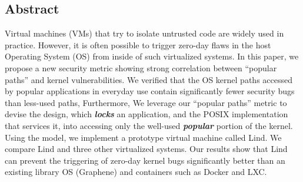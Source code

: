 \subsection*{Abstract}

%
%

%
%

Virtual machines (VMs) that try to isolate untrusted code are widely used in practice. 
However, it is often possible to trigger zero-day flaws
in the host Operating System (OS) from inside of such virtualized systems.
%
In this paper, we propose a new security metric showing strong correlation between ``popular paths'' 
and kernel vulnerabilities. We verified that the OS kernel paths accessed 
by popular applications in everyday use contain significantly fewer security bugs than less-used paths, 
Furthermore, We leverage our ``popular paths'' metric to devise the \lip design, which
\textbf{\textit{locks}} an application, and the POSIX implementation that services it, into
accessing only the well-used \textbf{\textit{popular}} portion of the kernel.  Using the \lip model, we
implement a prototype virtual machine called Lind.
%
We compare Lind and three other virtualized systems. 
Our results show that Lind can prevent the triggering of zero-day kernel bugs significantly better
than an existing library OS (Graphene) and containers such as Docker and LXC. 
